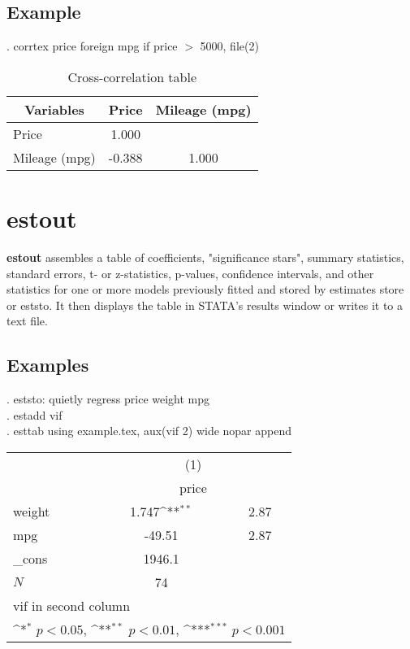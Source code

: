 \documentclass[12pt]{article}
\begin{document}
\subsection{Example}
.  corrtex price foreign mpg if price $>$ 5000, file(2)
\begin{table}[htbp]\centering \caption{Cross-correlation table\label{corrtable}}
\begin{tabular}{l  c  c }\hline\hline
\multicolumn{1}{c}{Variables} &Price&Mileage (mpg)\\ \hline
Price&1.000\\
Mileage (mpg)&-0.388&1.000\\
\hline \hline
 \end{tabular}
\end{table}

\section{estout}

\noindent \textbf{estout} assembles a table of coefficients, "significance stars", summary statistics, standard errors, t- or z-statistics, p-values, confidence intervals, and other statistics for one or more models previously fitted and stored by estimates store or eststo.  It then displays the table in STATA's results window or writes it to a text file.\\

\newpage

\subsection{Examples}

\noindent . eststo: quietly regress price weight mpg\\
. estadd vif\\
. esttab using example.tex, aux(vif 2) wide nopar append\\

{
\def\sym#1{\ifmmode^{#1}\else\(^{#1}\)\fi}
\begin{tabular}{l*{1}{cc}}
\hline\hline
            &\multicolumn{2}{c}{(1)}           \\
            &\multicolumn{2}{c}{price}         \\
\hline
weight      &       1.747\sym{**} &        2.87\\
mpg         &      -49.51         &        2.87\\
\_cons      &      1946.1         &            \\
\hline
\(N\)       &          74         &            \\
\hline\hline
\multicolumn{3}{l}{\footnotesize vif in second column}\\
\multicolumn{3}{l}{\footnotesize \sym{*} \(p<0.05\), \sym{**} \(p<0.01\), \sym{***} \(p<0.001\)}\\
\end{tabular}
}
\end{document}
